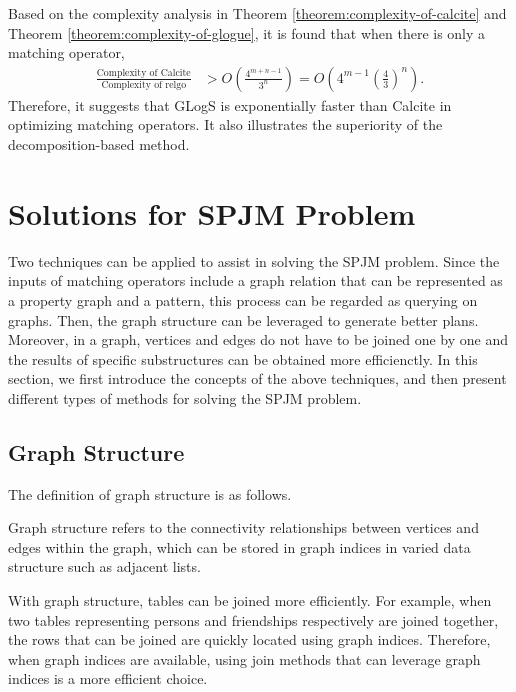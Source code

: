 Based on the complexity analysis in Theorem \ref{theorem:complexity-of-calcite} and Theorem \ref{theorem:complexity-of-glogue}, it is found that when there is only a matching operator,
\begin{equation*}
    \begin{split}
        \frac{\text{Complexity of Calcite}}{\text{Complexity of relgo}} & > O(\frac{4^{m+n-1}}{3^n}) = O(4^{m-1}(\frac{4}{3})^n).
    \end{split}
\end{equation*}
Therefore, it suggests that GLogS is exponentially faster than Calcite in optimizing matching operators.
It also illustrates the superiority of the decomposition-based method.

\iffalse
\section{Solutions for SPJM Problem}
Two techniques can be applied to assist in solving the SPJM problem.
Since the inputs of matching operators include a graph relation that can be represented as a property graph and a pattern, this process can be regarded as querying on graphs.
Then, the graph structure can be leveraged to generate better plans.
Moreover, in a graph, vertices and edges do not have to be joined one by one and the results of specific substructures can be obtained more efficienctly.
In this section, we first introduce the concepts of the above techniques, and then present different types of methods for solving the SPJM problem.

\subsection{Graph Structure}

The definition of graph structure is as follows.

\begin{definition}
    Graph structure refers to the connectivity relationships between vertices and edges within the graph, which can be stored in graph indices in varied data structure such as adjacent lists.
\end{definition}

With graph structure, tables can be joined more efficiently.
For example, when two tables representing persons and friendships respectively are joined together, the rows that can be joined are quickly located using graph indices.
Therefore, when graph indices are available, using join methods that can leverage graph indices is a more efficient choice.


